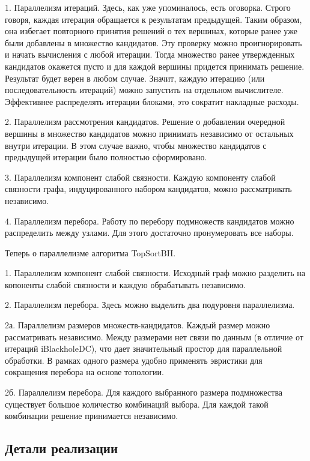 \documentclass[12pt,a4paper,oneside,openany]{article}
\theoremstyle{definition}
\theoremstyle{lemma}
\theoremstyle{remark}
\begin{document}
1. Параллелизм итераций. Здесь, как уже упоминалось, есть оговорка.
Строго говоря, каждая итерация обращается к результатам предыдущей.
Таким образом, она избегает повторного принятия решений о тех вершинах,
которые ранее уже были добавлены в множество кандидатов.
Эту проверку можно проигнорировать и начать вычисления с любой итерации.
Тогда множество ранее утвержденных кандидатов окажется пусто и для
каждой вершины придется принимать решение. Результат будет верен в любом случае.
Значит, каждую итерацию (или последовательность итераций) можно запустить на отдельном вычислителе.
Эффективнее распределять итерации блоками, это сократит накладные расходы.

2. Параллелизм рассмотрения кандидатов. Решение о добавлении очередной вершины
в множество кандидатов можно принимать независимо от остальных внутри итерации.
В этом случае важно, чтобы множество кандидатов с предыдущей итерации было полностью сформировано.

3. Параллелизм компонент слабой связности. Каждую компоненту слабой связности графа, индуцированного
набором кандидатов, можно рассматривать независимо.

4. Параллелизм перебора. Работу по перебору подмножеств кандидатов можно распределить между узлами.
Для этого достаточно пронумеровать все наборы.

Теперь о параллелизме алгоритма TopSortBH.

1. Параллелизм компонент слабой связности. Исходный граф можно разделить на копоненты слабой связности
и каждую обрабатывать независимо.

2. Параллелизм перебора. Здесь можно выделить два подуровня параллелизма.

2а. Параллелизм размеров множеств-кандидатов. Каждый размер можно рассматривать независимо.
Между размерами нет связи по данным (в отличие от итераций iBlackholeDC), что дает значительный простор
для параллельной обработки.
В рамках одного размера удобно применять эвристики для сокращения перебора на основе топологии.

2б. Параллелизм перебора. Для каждого выбранного размера подмножества существует большое количество
комбинаций выбора. Для каждой такой комбинации решение принимается независимо.

\subsection{Детали реализации}\label{subsec:implementation}
\end{document}
